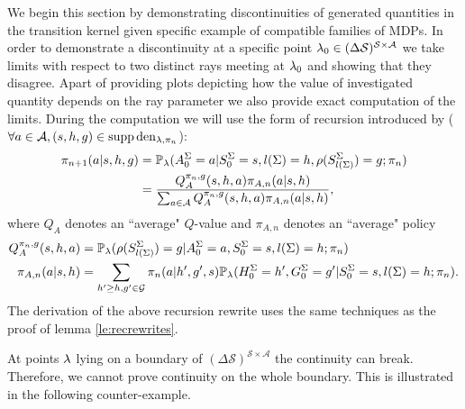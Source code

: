 We begin this section by demonstrating discontinuities of \eUDRL{} generated quantities in the transition kernel given specific example of compatible families of MDPs.
In order to demonstrate a discontinuity at a specific point $\mathit{\lambda}_0 \in (\Delta \mathcal{S})^{\mathcal{S}\times\mathcal{A}}$
we take limits with respect to two distinct rays meeting at $\mathit{\lambda}_0$ and showing that they disagree. Apart of providing plots
depicting how the value of investigated quantity depends on the ray parameter we also provide exact computation of the limits.
During the computation we will use the form of \eUDRL{} recursion
introduced by \citet{strupl2022upsidedown}
($\forall a\in \mathcal{A},(s,h,g)\in \operatorname*{\mathrm{supp}} \mathrm{den}_{\mathit{\lambda},\pi_n}$):
\begin{equation}
\begin{aligned}
\pi_{n+1}(a|s,h,g)
&=
\mathbb{P}_{\mathit{\lambda}}(A^{\Sigma}_0=a|S^{\Sigma}_0=s,l(\Sigma)=h,\rho(S^{\Sigma}_{l(\Sigma)}) = g; \pi_n)
\\
&=
\frac{
Q_{A}^{\pi_n,g}(s,h,a)
\pi_{A,n} (a|s,h)
}
{
\sum_{a\in\mathcal{A}} Q_{A}^{\pi_n,g}(s,h,a) \pi_{A,n} (a|s,h)
}
,
\end{aligned}
\label{eq:recursion}
\end{equation}
where $Q_{A}$ denotes an ``average" $Q$-value and $\pi_{A,n}$ denotes
an ``average" policy
\begin{equation}
\begin{aligned}
Q_{A}^{\pi_n,g}(s,h,a) &= 
\mathbb{P}_{\mathit{\lambda}}(\rho (S^{\Sigma}_{l(\Sigma)})=g | A^{\Sigma}_0=a, S^{\Sigma}_0=s,l(\Sigma)=h; \pi_n)
\\
\pi_{A,n} (a|s,h) &=
\sum_{h'\geq h,g'\in\mathcal{G}}
\pi_n (a|h',g',s)
\mathbb{P}_{\mathit{\lambda}}( H^{\Sigma}_0=h', G^{\Sigma}_0=g' |S^{\Sigma}_0=s,l(\Sigma)=h; \pi_n)
.\label{eq:apolicy}
\end{aligned}
\end{equation}
The derivation of the above \eUDRL{} recursion rewrite uses the same techniques as the proof of lemma \ref{le:recrewrites}.%

At points $\mathit{\lambda}$ lying on a boundary of $(\Delta \mathcal{S})^{\mathcal{S}\times\mathcal{A}}$ the continuity can break. Therefore, we cannot prove continuity on the whole
boundary.
This is illustrated in the following counter-example.

